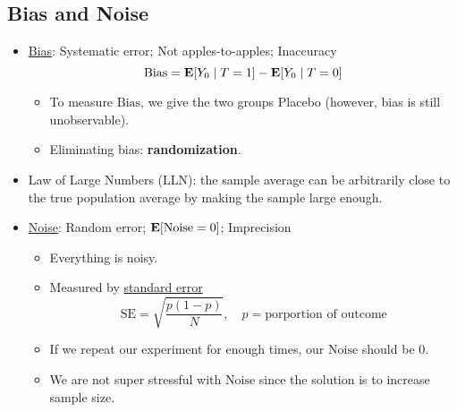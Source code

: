 \documentclass[10pt, letterpaper]{article}
\def\E{\vb{E}}
\def\Bias{\mathrm{Bias}}
\def\SE{\mathrm{SE}}
\begin{document}
\begin{multicols}{2}
\section*{Bias and Noise}
\begin{itemize}
	\item \underline{Bias}: Systematic error; Not apples-to-apples; Inaccuracy \[\Bias=\E[Y_0\mid T=1]-\E[Y_0\mid T=0]\]
	\begin{itemize}
		\item To measure $\Bias$, we give the two groups Placebo (however, bias is still unobservable). 
		\item Eliminating bias: \textbf{randomization}.
	\end{itemize}
	\item Law of Large Numbers (LLN): the sample average can be arbitrarily close to the true population average by making the sample large enough. 
	\item \underline{Noise}: Random error; $\E\qty[\mathrm{Noise}=0]$; Imprecision
	\begin{itemize}
		\item Everything is noisy.
		\item Measured by \underline{standard error} \[\SE=\sqrt{\frac{p(1-p)}{N}},\quad p=\text{porportion of outcome}\]
		\item If we repeat our experiment for enough times, our $\mathrm{Noise}$ should be $0$.
		\item We are not super stressful with $\mathrm{Noise}$ since the solution is to increase sample size. 
	\end{itemize}
\end{itemize}


\end{multicols}
\end{document}
